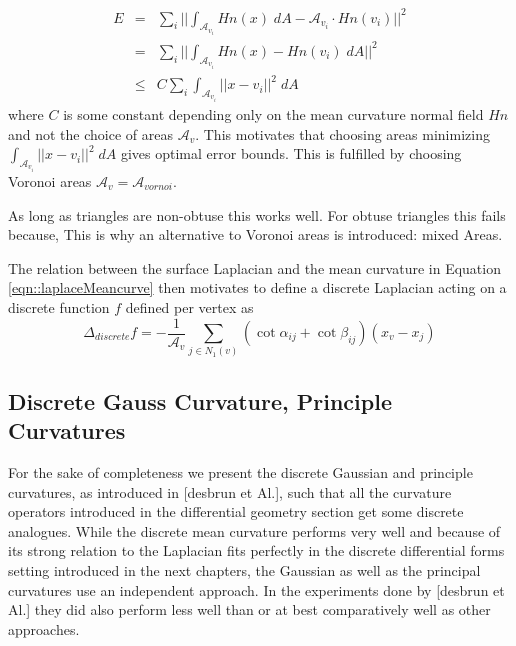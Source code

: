 \begin{eqnarray*}E &=& \sum_{i}||\int_{\mathcal A_{v_i}} Hn(x)\; dA - \mathcal A_{v_i} \cdot Hn(v_i)||^2 \\
&=&\sum_{i}||\int_{\mathcal A_{v_i}} Hn(x) - Hn(v_i)\; dA||^2 \\
&\leq & C \sum_{i}\int_{\mathcal A_{v_i}} ||x - v_i||^2\; dA
\end{eqnarray*}
where $C$ is some constant depending only on the mean curvature normal field $Hn$ and not the choice of areas $\mathcal A_v$. This motivates that choosing areas  minimizing $\int_{\mathcal A_{v_i}} ||x - v_i||^2\; dA$ gives optimal error bounds. This is fulfilled by choosing Voronoi areas $\mathcal  A_v = \mathcal A_{vornoi}$. 


As long as triangles are non-obtuse this works well. For obtuse triangles this fails because,  This is why an alternative to Voronoi areas is introduced: mixed Areas.


The relation between the surface Laplacian and the mean curvature in Equation \ref{eqn::laplaceMeancurve} then motivates to define a discrete Laplacian acting on a discrete function $f$ defined per vertex as
\[\Delta_{discrete} f = -\frac{1}{\mathcal A_v}\sum_{j\in N_1(v)} (\cot \alpha_{ij} + \cot \beta_{ij})(x_v-x_j)\] 

\subsection{Discrete Gauss Curvature, Principle Curvatures}
For the sake of completeness we present the discrete Gaussian and principle curvatures, as introduced in [desbrun et Al.], such that all the curvature operators introduced in the differential geometry section get some discrete analogues. While the discrete mean curvature performs very well and because of its strong relation to the Laplacian fits perfectly in the discrete differential forms setting introduced in the next chapters, the Gaussian as well as the principal curvatures use an independent approach. In the experiments done by [desbrun et Al.] they did also perform less well than or at best comparatively well as other approaches. 


